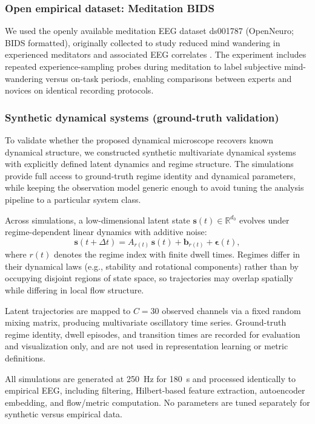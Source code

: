 \documentclass[5p,twocolumn,authoryear]{elsarticle}
\begin{document}
\subsubsection{Open empirical dataset: Meditation BIDS}
We used the openly available meditation EEG dataset ds001787 (OpenNeuro; BIDS formatted), originally collected to study reduced mind wandering in experienced meditators and associated EEG correlates \citep{BrandmeyerDelorme2016,Delorme2018BIDS}. The experiment includes repeated experience-sampling probes during meditation to label subjective mind-wandering versus on-task periods, enabling comparisons between experts and novices on identical recording protocols.

\subsubsection{Synthetic dynamical systems (ground-truth validation)}
To validate whether the proposed dynamical microscope recovers known dynamical structure, we constructed synthetic multivariate dynamical systems with explicitly defined latent dynamics and regime structure. The simulations provide full access to ground-truth regime identity and dynamical parameters, while keeping the observation model generic enough to avoid tuning the analysis pipeline to a particular system class.

Across simulations, a low-dimensional latent state $\mathbf{s}(t) \in \mathbb{R}^{d_0}$ evolves under regime-dependent linear dynamics with additive noise:
\begin{equation}
\mathbf{s}(t+\Delta t) = A_{r(t)}\,\mathbf{s}(t) + \mathbf{b}_{r(t)} + \boldsymbol{\epsilon}(t),
\end{equation}
where $r(t)$ denotes the regime index with finite dwell times. Regimes differ in their dynamical laws (e.g., stability and rotational components) rather than by occupying disjoint regions of state space, so trajectories may overlap spatially while differing in local flow structure.

Latent trajectories are mapped to $C=30$ observed channels via a fixed random mixing matrix, producing multivariate oscillatory time series. Ground-truth regime identity, dwell episodes, and transition times are recorded for evaluation and visualization only, and are not used in representation learning or metric definitions.

All simulations are generated at 250~Hz for 180~s and processed identically to empirical EEG, including filtering, Hilbert-based feature extraction, autoencoder embedding, and flow/metric computation. No parameters are tuned separately for synthetic versus empirical data.
\end{document}
